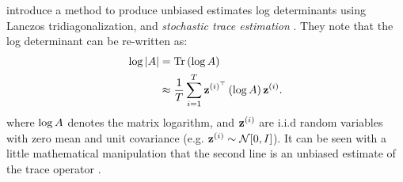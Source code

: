 \citet{ubaru2017fast} introduce a method to produce unbiased estimates log determinants using Lanczos tridiagonalization, and \emph{stochastic trace estimation} \cite{hutchinson1990stochastic,avron2011randomized,fitzsimons2016improved}.
They note that the log determinant can be re-written as:
%
\begin{align}
  \log \vert \bA \vert &= \tr{ \log \bA }
  \nonumber \\
  &\approx \frac{1}{T} \sum_{i=1}^T \bz^{(i)^\top} \left( \log \bA \right) \bz^{(i)}.
  \label{eqn:logdet_sta}
\end{align}
%
where $\log A$ denotes the matrix logarithm, and $\mathbf{z}^{(i)}$ are i.i.d random variables with zero mean and unit covariance (e.g. $\bz^{(i)} \sim \normaldist{0}{\bI}$).
It can be seen with a little mathematical manipulation that the second line is an unbiased estimate of the trace operator \cite{hutchinson1990stochastic}.

